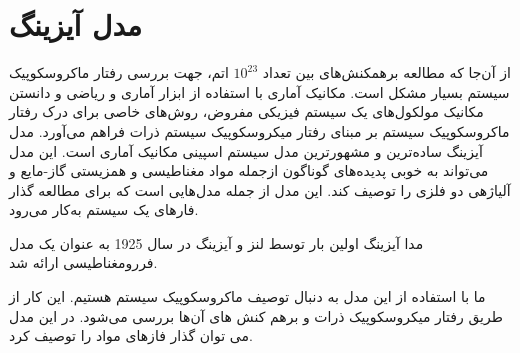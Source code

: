 \documentclass[a4paper,12pt]{article}
\begin{document}
\section{مدل آیزینگ}
از آن‌جا که مطالعه برهمکنش‌های بین تعداد
$10^{23}$
اتم، جهت بررسی رفتار ماکروسکوپیک سیستم بسیار مشکل است.
مکانیک آماری با استفاده از ابزار آماری و ریاضی و دانستن
مکانیک مولکول‌های یک سیستم فیزیكی مفروض، روش‌های خاصی برای درک رفتار
ماکروسکوپیک سیستم بر مبنای رفتار میکروسکوپیک سیستم ذرات
فراهم می‌آورد.
مدل آیزینگ ساده‌ترین و مشهور‌ترین مدل سیستم اسپینی مکانیک آماری است. این مدل می‌تواند به خوبی پدیده‌های گوناگون ازجمله مواد مغناطیسی و همزیستی گاز-مایع و آلیاژهی دو فلزی را توصیف کند. این مدل از جمله مدل‌هایی است که برای مطالعه گذار فارهای یک سیستم به‌کار می‌رود.

مدا آیزینگ اولین بار توسط لنز و آیزینگ در سال 1925 به عنوان یک مدل فررومغناطیسی ارائه شد.


ما با استفاده از این مدل به دنبال توصیف ماکروسکوپیک سیستم هستیم.
این کار از طریق رفتار میکروسکوپیک ذرات و بر‌هم کنش های آن‌ها بررسی می‌شود.
در این مدل می توان گذار فازهای مواد را توصیف کرد.
\end{document}
